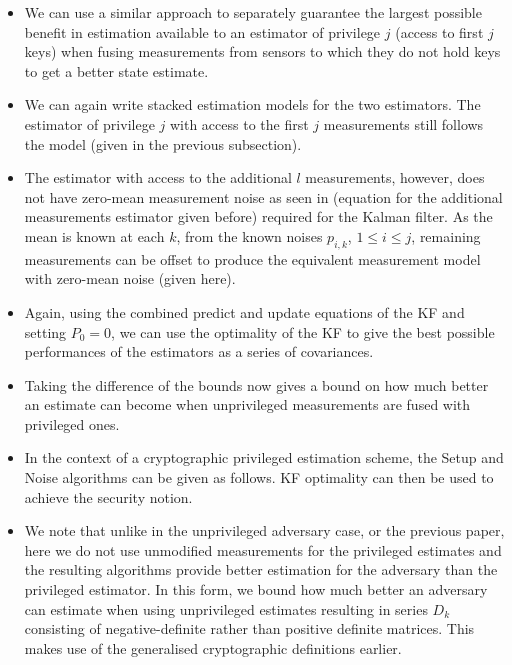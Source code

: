\documentclass[conference]{IEEEtran}
\theoremstyle{definition}
\theoremstyle{remark}
\begin{document}
\begin{itemize}
  \item We can use a similar approach to separately guarantee the largest possible benefit in estimation available to an estimator of privilege $j$ (access to first $j$ keys) when fusing measurements from sensors to which they do not hold keys to get a better state estimate.
  \item We can again write stacked estimation models for the two estimators. The estimator of privilege $j$ with access to the first $j$ measurements still follows the model (given in the previous subsection).
  \item The estimator with access to the additional $l$ measurements, however, does not have zero-mean measurement noise as seen in (equation for the additional measurements estimator given before) required for the Kalman filter. As the mean is known at each $k$, from the known noises $p_{i,k}$, $1\leq i\leq j$, remaining measurements can be offset to produce the equivalent measurement model with zero-mean noise (given here).
  \item Again, using the combined predict and update equations of the KF and setting $P_0=0$, we can use the optimality of the KF to give the best possible performances of the estimators as a series of covariances.
  \item Taking the difference of the bounds now gives a bound on how much better an estimate can become when unprivileged measurements are fused with privileged ones.
  \item In the context of a cryptographic privileged estimation scheme, the Setup and Noise algorithms can be given as follows. KF optimality can then be used to achieve the security notion.
  \item We note that unlike in the unprivileged adversary case, or the previous paper, here we do not use unmodified measurements for the privileged estimates and the resulting algorithms provide better estimation for the adversary than the privileged estimator. In this form, we bound how much better an adversary can estimate when using unprivileged estimates resulting in series $D_k$ consisting of negative-definite rather than positive definite matrices. This makes use of the generalised cryptographic definitions earlier.
\end{itemize}

% 
%                                 
%                                 
%                                 
% 
\end{document}
